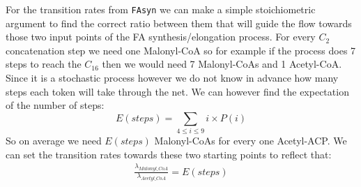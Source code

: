 For the transition rates from \texttt{FAsyn} we can make a simple
stoichiometric argument to find the correct ratio between them that
will guide the flow towards those two input points of the FA
synthesis/elongation process. For every $C_2$ concatenation step we
need one Malonyl-CoA so for example if the process does 7 steps to
reach the $C_{16}$ then we would need 7 Malonyl-CoAs and 1
Acetyl-CoA. Since it is a stochastic process however we do not know in
advance how many steps each token will take through the net. We can
however find the expectation of the number of steps:
\begin{equation*}
E(steps)=\sum_{4 \leq i \leq 9} i \times P(i)
\end{equation*}
So on average we need $E(steps)$ Malonyl-CoAs for every one
Acetyl-ACP. We can set the transition rates towards these two starting
points to reflect that:
\begin{align*}
\frac{\lambda_{Malonyl\_CoA}}{\lambda_{Acetyl\_CoA}} = E(steps)
\end{align*}


